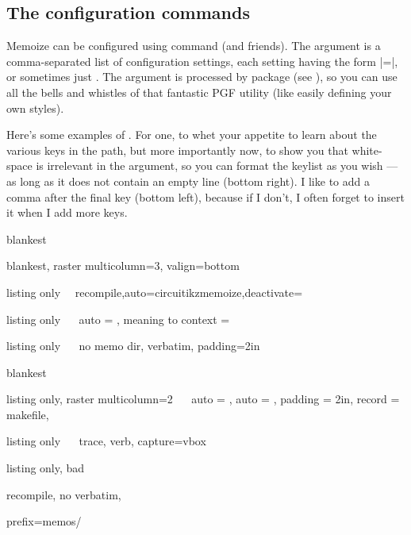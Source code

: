 \documentclass[a4paper,11pt]{article}
\begin{document}
\subsection{The configuration commands}
\label{sec:mmzset}

Memoize can be configured using command 
(and friends). The  argument is a comma-separated list of
configuration settings, each setting having the form |=|,
or sometimes just .  The  argument is processed by package
 (see ), so you can use all the bells and whistles
of that fantastic PGF utility (like easily defining your own styles).

Here's some examples of .  For one, to whet your appetite to
learn about the various keys in the  path, but more
importantly now, to show you that white-space is irrelevant in the
 argument, so you can format the keylist as you wish --- as long
as it does not contain an empty line (bottom right).  I like to add a comma
after the final key (bottom left), because if I don't, I often forget to insert
it when I add more keys.

\begin{tcboxedraster}[raster columns=4, raster valign=bottom]{blankest}
  \begin{tcboxedraster}[raster columns=1]{blankest, raster multicolumn=3, valign=bottom}
    \begin{tcblisting}{listing only}
~\mmzset~{recompile,auto={circuitikz}{memoize},deactivate=\tikz}
    \end{tcblisting}
    \begin{tcblisting}{listing only}
~\mmzset~{ auto = , meaning to context = \foo }
    \end{tcblisting}
  \end{tcboxedraster}
  \begin{tcblisting}{listing only}
~\mmzset~{
  no memo dir,
  verbatim,
  padding=2in}
  \end{tcblisting}
\end{tcboxedraster}\par
\begin{tcboxedraster}[raster columns=4, raster valign=top]{blankest}
  \begin{tcblisting}{listing only, raster multicolumn=2}
~\mmzset~{
  auto    = ,
  auto    = ,
  padding = 2in,
  record  = makefile,
}
  \end{tcblisting}
  \begin{tcblisting}{listing only}
~\mmzset~{
  trace,
  verb,
  capture=vbox
}
  \end{tcblisting}
  \begin{tcblisting}{listing only, bad}
~\mmzset~{
  recompile,
  no verbatim,

  prefix=memos/
}
  \end{tcblisting}
\end{tcboxedraster}
\end{document}
